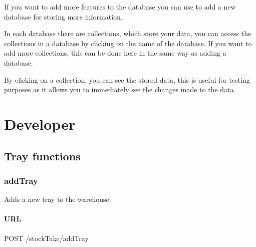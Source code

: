 \documentclass[letterpaper,10pt,english]{sphinxmanual}
\let\sphinxpxdimen\pdfpxdimen\else\newdimen\sphinxpxdimen
\let\oldsubsection\subsection
\renewcommand{\subsection}{\needspace{6\baselineskip}\oldsubsection}
\begin{document}
\noindent\sphinxincludegraphics[width=300\sphinxpxdimen]{{databases}.png}

If you want to add more features to the database you can use
 to add a new database for storing more information.

In each database there are collections, which store your data, you can
access the collections in a database by clicking on the name of the
database. If you want to add more collections, this can be done here in
the same way as adding a database.

By clicking on a collection, you can see the stored data, this is useful
for testing purposes as it allows you to immediately see the changes
made to the data.


\chapter{Developer}
\label{\detokenize{index:developer}}

\section{Tray functions}
\label{\detokenize{docs/Developer/index:tray-functions}}\label{\detokenize{docs/Developer/index::doc}}

\subsection{addTray}
\label{\detokenize{docs/Developer/addTray:addtray}}\label{\detokenize{docs/Developer/addTray::doc}}
Adds a new tray to the warehouse.


\subsubsection{URL}
\label{\detokenize{docs/Developer/addTray:url}}
\begin{sphinxVerbatim}[commandchars=\\\{\}]
POST /stockTake/addTray
\end{sphinxVerbatim}
\end{document}
